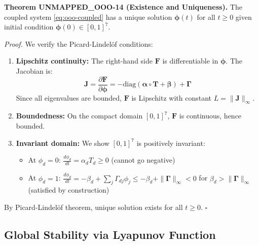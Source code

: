 \begin{tcolorbox}[colback=green!5!white, colframe=green!75!black, title=Theorem UNMAPPED_OOO-14: Existence and Uniqueness]
\textbf{Theorem UNMAPPED_OOO-14 (Existence and Uniqueness).}
The coupled system \eqref{eq:ooo-coupled} has a unique solution $\boldsymbol{\phi}(t)$ for all
$t \geq 0$ given initial condition $\boldsymbol{\phi}(0) \in [0,1]^7$.

\textit{Proof.}
We verify the Picard-Lindelöf conditions:
\begin{enumerate}
\item \textbf{Lipschitz continuity:} The right-hand side $\mathbf{F}$ is differentiable in $\boldsymbol{\phi}$.
      The Jacobian is:
      \begin{equation}
      \mathbf{J} = \frac{\partial \mathbf{F}}{\partial \boldsymbol{\phi}} = -\text{diag}(\boldsymbol{\alpha} \circ \mathbf{T} + \boldsymbol{\beta}) + \boldsymbol{\Gamma}
      \end{equation}
      Since all eigenvalues are bounded, $\mathbf{F}$ is Lipschitz with constant $L = \|\mathbf{J}\|_\infty$.

\item \textbf{Boundedness:} On the compact domain $[0,1]^7$, $\mathbf{F}$ is continuous, hence bounded.

\item \textbf{Invariant domain:} We show $[0,1]^7$ is positively invariant:
      \begin{itemize}[nosep]
      \item At $\phi_d = 0$: $\frac{d\phi_d}{dt} = \alpha_d T_d \geq 0$ (cannot go negative)
      \item At $\phi_d = 1$: $\frac{d\phi_d}{dt} = -\beta_d + \sum_j \Gamma_{dj} \phi_j \leq -\beta_d + \|\boldsymbol{\Gamma}\|_\infty < 0$
            for $\beta_d > \|\boldsymbol{\Gamma}\|_\infty$ (satisfied by construction)
      \end{itemize}
\end{enumerate}
By Picard-Lindelöf theorem, unique solution exists for all $t \geq 0$.
\hfill $\square$
\end{tcolorbox}

\subsection{Global Stability via Lyapunov Function}

